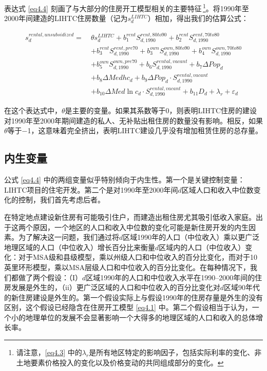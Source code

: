 \documentclass[lang=cn,11pt,a4paper]{paper}
\begin{document}
表达式 \eqref{eq4.4} 刻画了与大部分的住房开工模型相关的主要特征\,\footnote{请注意，\eqref{eq4.3} 中的$\lambda_{r}$是所有地区特定的影响因子，包括实际利率的变化、非土地要素价格投入的变化以及价格变动的共同组成部分的变化。}。将1990年至2000年间建造的LIHTC住房数量（记为$s_d^{LIHTC}$）相加，得出我们的估算公式：

\begin{equation}\label{eq4.5}
  \begin{aligned}
    s_{d}^{rental,unsubsidized}=\ & \theta s_{d}^{LIHTC}+b_{1}^{rent} S_{d, 1990}^{rent, 80 to 90}+b_{2}^{rent} S_{d, 1990}^{rent, 70 t o 80} \\
    &+b_{3}^{rent } S_{d, 1990}^{rent , pre 70}+b_{3}^{own} S_{d, 1990}^{own, 80 to90}+b_{4}^{own } S_{d, 1990}^{own, 70 to 80} \\
    &+b_{5}^{own} S_{d, 1990}^{own,pre70}+b_{6} S_{d, 1990}^{rental,vacant}+b_{7} \Delta P o p_{d} \\
    &+b_{8} \Delta M e d h c_{d}+b_{9} \Delta P o p_{d} \cdot S_{d, 1990}^{rental, vacant} \\
    &+b_{10} \Delta M e d \ln c_{d} \cdot S_{d, 1990}^{rental, vacant}+b_{11} D_{d}+\lambda_{r}+\varepsilon_{d}
    \end{aligned}
\end{equation}
\vspace{2pt}

在这个表达式中，$\theta$是主要的变量。如果其系数等于0，则表明LIHTC住房的建设对1990年至2000年期间建造的私人、无补贴出租住房的数量没有影响。相反，如果$\theta$等于$-$1，这意味着完全挤出，表明LIHTC建设几乎没有增加租赁住房的总存量。

\subsection{内生变量}

公式 \eqref{eq4.4} 中的两组变量似乎特别倾向于内生性。第一个是关键控制变量：LIHTC项目的住宅开发。第二个是对1990年至2000年间$d$区域人口和收入中位数变化的控制，我们首先考虑后者。

在特定地点建设新住房有可能吸引住户，而建造出租住房尤其吸引低收入家庭。出于这两个原因，一个地区的人口和收入中位数的变化可能是新住房开发的内生因素。为了解决这一问题，我们通过将$d$区域1990年的人口（中位收入）乘以更广泛地理区域的人口（中位收入）增长百分比来衡量$d$区域内的人口（中位收入）变化：对于MSA级和县级模型，乘以州级人口和中位收入的百分比变化，而对于10英里环形模型，乘以MSA层级人口和中位收入的百分比变化。在每种情况下，我们都做了两个假设：（I）$d$区域1990年的人口和中位收入水平在1990--2000年间的住房发展是外生的，（ii）更广泛区域的人口和中位收入的百分比变化对$d$区域90年代的新住房建设是外生的。第一个假设实际上与假设1990年的住房存量是外生的没有区别，这个假设已经隐含在住房开工模型 \eqref{eq4.1} 中。第二个假设相当于认为，一个小的地理单位的发展不会显著影响一个大得多的地理区域的人口和收入的总体增长率。
\end{document}

